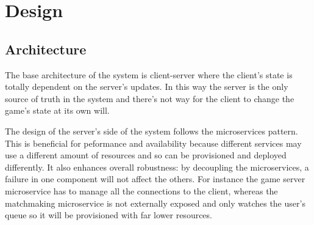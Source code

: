 \documentclass{scrartcl}
\begin{document}
\section{Design}\label{design}
%
%
%
%
%
\subsection{Architecture}\label{architecture}
The base architecture of the system is client-server where the client's state is
totally dependent on the server's updates. In this way the server is the only
source of truth in the system and there's not way for the client to change the game's
state at its own will.

The design of the server's side of the system follows the microservices pattern.
This is beneficial for peformance and availability because different services may use a different
amount of resources and so can be provisioned and deployed differently.
It also enhances overall robustness: by decoupling the microservices, a failure in
one component will not affect the others. 
For instance the game server microservice has to manage all the connections to 
the client, whereas the matchmaking microservice is not externally exposed and only
watches the user's queue so it will be provisioned with far lower resources.
\end{document}
